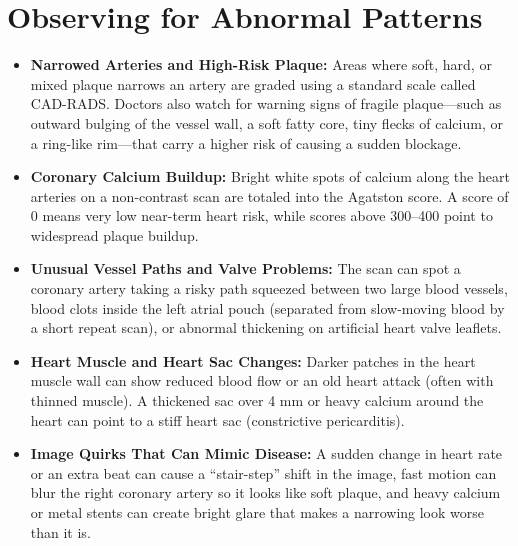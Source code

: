 \section{Observing for Abnormal Patterns}
\begin{itemize}
    \item \textbf{Narrowed Arteries and High-Risk Plaque:} Areas where soft, hard, or mixed plaque narrows an artery are graded using a standard scale called CAD-RADS. Doctors also watch for warning signs of fragile plaque---such as outward bulging of the vessel wall, a soft fatty core, tiny flecks of calcium, or a ring-like rim---that carry a higher risk of causing a sudden blockage.
    \item \textbf{Coronary Calcium Buildup:} Bright white spots of calcium along the heart arteries on a non-contrast scan are totaled into the Agatston score. A score of 0 means very low near-term heart risk, while scores above 300--400 point to widespread plaque buildup.
    \item \textbf{Unusual Vessel Paths and Valve Problems:} The scan can spot a coronary artery taking a risky path squeezed between two large blood vessels, blood clots inside the left atrial pouch (separated from slow-moving blood by a short repeat scan), or abnormal thickening on artificial heart valve leaflets.
    \item \textbf{Heart Muscle and Heart Sac Changes:} Darker patches in the heart muscle wall can show reduced blood flow or an old heart attack (often with thinned muscle). A thickened sac over 4 mm or heavy calcium around the heart can point to a stiff heart sac (constrictive pericarditis).
    \item \textbf{Image Quirks That Can Mimic Disease:} A sudden change in heart rate or an extra beat can cause a ``stair-step'' shift in the image, fast motion can blur the right coronary artery so it looks like soft plaque, and heavy calcium or metal stents can create bright glare that makes a narrowing look worse than it is.
\end{itemize}


